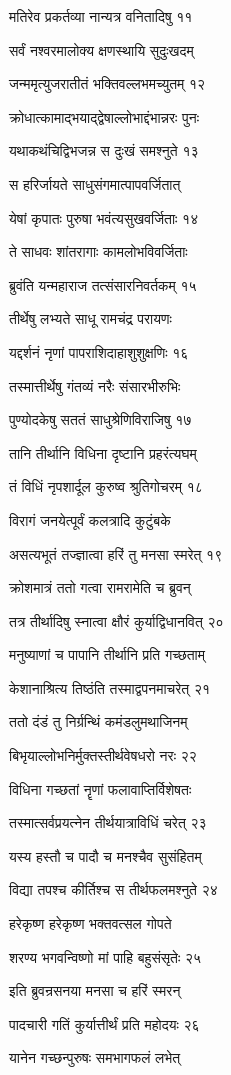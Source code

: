 मतिरेव प्रकर्तव्या नान्यत्र वनितादिषु ११

सर्वं नश्वरमालोक्य क्षणस्थायि सुदुःखदम्

जन्ममृत्युजरातीतं भक्तिवल्लभमच्युतम् १२

क्रोधात्कामाद्भयाद्द्वेषाल्लोभाद्दंभान्नरः पुनः

यथाकथंचिद्विभजन्न स दुःखं समश्नुते १३

स हरिर्जायते साधुसंगमात्पापवर्जितात्

येषां कृपातः पुरुषा भवंत्यसुखवर्जिताः १४

ते साधवः शांतरागाः कामलोभविवर्जिताः

ब्रुवंति यन्महाराज तत्संसारनिवर्तकम् १५

तीर्थेषु लभ्यते साधू रामचंद्र परायणः

यद्दर्शनं नृणां पापराशिदाहाशुशुक्षणिः १६

तस्मात्तीर्थेषु गंतव्यं नरैः संसारभीरुभिः

पुण्योदकेषु सततं साधुश्रेणिविराजिषु १७

तानि तीर्थानि विधिना दृष्टानि प्रहरंत्यघम्

तं विधिं नृपशार्दूल कुरुष्व श्रुतिगोचरम् १८

विरागं जनयेत्पूर्वं कलत्रादि कुटुंबके

असत्यभूतं तज्ज्ञात्वा हरिं तु मनसा स्मरेत् १९

क्रोशमात्रं ततो गत्वा रामरामेति च ब्रुवन्

तत्र तीर्थादिषु स्नात्वा क्षौरं कुर्याद्विधानवित् २०

मनुष्याणां च पापानि तीर्थानि प्रति गच्छताम्

केशानाश्रित्य तिष्ठंति तस्माद्वपनमाचरेत् २१

ततो दंडं तु निर्ग्रन्थिं कमंडलुमथाजिनम्

बिभृयाल्लोभनिर्मुक्तस्तीर्थवेषधरो नरः २२

विधिना गच्छतां नॄणां फलावाप्तिर्विशेषतः

तस्मात्सर्वप्रयत्नेन तीर्थयात्राविधिं चरेत् २३

यस्य हस्तौ च पादौ च मनश्चैव सुसंहितम्

विद्या तपश्च कीर्तिश्च स तीर्थफलमश्नुते २४

हरेकृष्ण हरेकृष्ण भक्तवत्सल गोपते

शरण्य भगवन्विष्णो मां पाहि बहुसंसृतेः २५

इति ब्रुवन्रसनया मनसा च हरिं स्मरन्

पादचारी गतिं कुर्यात्तीर्थं प्रति महोदयः २६

यानेन गच्छन्पुरुषः समभागफलं लभेत्

